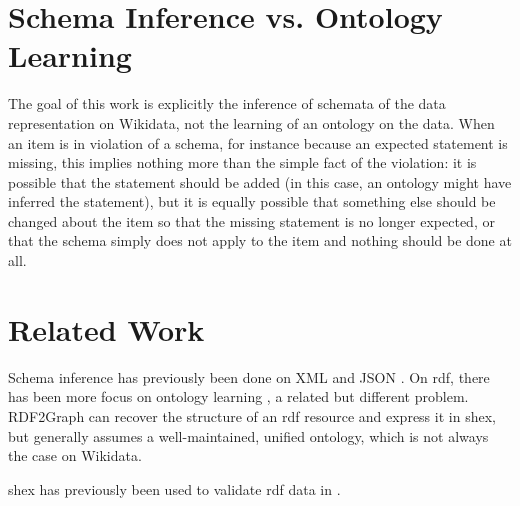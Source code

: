 \documentclass{scrartcl}
\begin{document}
\section{Schema Inference vs. Ontology Learning}

The goal of this work is explicitly the inference of schemata of the data representation on Wikidata,
not the learning of an ontology on the data.
When an item is in violation of a schema,
for instance because an expected statement is missing,
this implies nothing more than the simple fact of the violation:
it is possible that the statement should be added
(in this case, an ontology might have inferred the statement),
but it is equally possible that something else should be changed about the item so that the missing statement is no longer expected,
or that the schema simply does not apply to the item and nothing should be done at all.

\section{Related Work}

Schema inference has previously been done on XML \cite{Bex:2007:IXS:1325851.1325964} and JSON \cite{json-inference}.
On \gls{rdf}, there has been more focus on ontology learning \cite{Zhou2007}, a related but different problem.
RDF2Graph \cite{vanDam2015} can recover the structure of an \gls{rdf} resource and express it in \gls{shex},
but generally assumes a well-maintained, unified ontology,
which is not always the case on Wikidata.

\gls{shex} has previously been used to validate \gls{rdf} data in \cite{SOLBRIG201790}.



\end{document}
